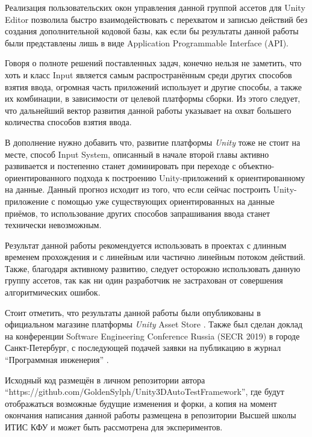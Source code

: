Реализация пользовательских окон управления данной группой ассетов для Unity Editor позволила быстро взаимодействовать с перехватом и записью действий без создания дополнительной кодовой базы, как если бы результаты данной работы были представлены лишь в виде Application Programmable Interface (API).

Говоря о полноте решений поставленных задач, конечно нельзя не заметить, что хоть и класс Input является самым распространённым среди других способов взятия ввода, огромная часть приложений использует и другие способы, а также их комбинации, в зависимости от целевой платформы сборки. Из этого следует, что дальнейший вектор развития данной работы указывает на охват большего количества способов взятия ввода. 

В дополнение нужно добавить что, развитие платформы \textit{Unity} тоже не стоит на месте, способ Input System, описанный в начале второй главы активно развивается и постепенно станет доминировать при переходе с объектно-ориентированного подхода к построению Unity-приложений к ориентированному на данные. Данный прогноз исходит из того, что если сейчас построить Unity-приложение с помощью уже существующих ориентированных на данные приёмов, то использование других способов запрашивания ввода станет технически невозможным.

Результат данной работы рекомендуется использовать в проектах с длинным временем прохождения и с линейным или частично линейным потоком действий. Также, благодаря активному развитию, следует осторожно использовать данную группу ассетов, так как ни один разработчик не застрахован от совершения алгоритмических ошибок.

Стоит отметить, что результаты данной работы были опубликованы в официальном магазине платформы \textit{Unity} Asset Store \cite{assetstore}. Также был сделан доклад на конференции Software Engineering Conference Russia (SECR 2019) \cite{secr} в городе Санкт-Петербург, с последующей подачей заявки на публикацию в журнал ``Программная инженерия'' \cite{prog_engine_journal}.

Исходный код размещён в личном репозитории автора ``https://github.com/GoldenSylph/Unity3DAutoTestFramework'', где будут отображаться возможные будущие изменения и форки, а копия на момент окончания написания данной работы размещена в репозитории Высшей школы ИТИС КФУ \cite{gitlab} и может быть рассмотрена для экспериментов.